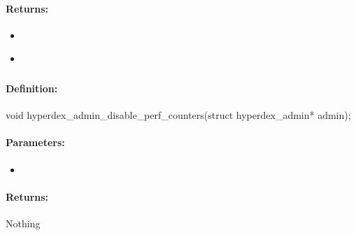 \paragraph{Returns:}
\begin{itemize}[noitemsep]
\item {}\\

\item {}\\

\end{itemize}

\pagebreak
\subsubsection{}
\label{api:c:disable_perf_counters}


\paragraph{Definition:}
\begin{ccode}
void hyperdex_admin_disable_perf_counters(struct hyperdex_admin* admin);
\end{ccode}

\paragraph{Parameters:}
\begin{itemize}[noitemsep]
\item {}\\

\end{itemize}

\paragraph{Returns:}
Nothing